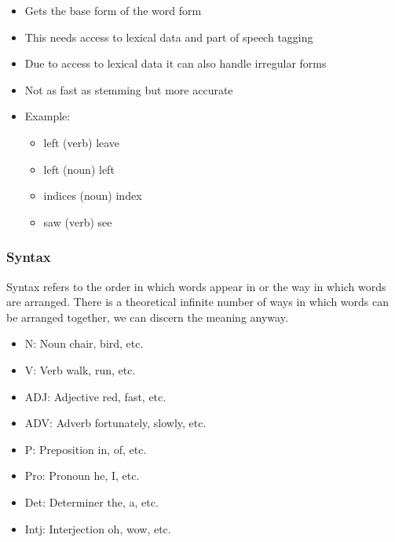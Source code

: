 \documentclass[
../../NLP4W_Summary.tex,
]
{subfiles}
\begin{document}
\begin{defbox}
\begin{itemize}
\begin{itemize}
            \item Gets the base form of the word form
            \item This needs access to lexical data and part of speech tagging
            \item Due to access to lexical data it can also handle irregular forms
            \item Not as fast as stemming but more accurate
            \item Example:
            \begin{itemize}
                \item left (verb) \rightarrow leave
                \item left (noun) \rightarrow left
                \item indices (noun) \rightarrow index
                \item saw (verb) \rightarrow see
            \end{itemize}
        \end{itemize}
    \end{itemize}
\end{defbox}

\subsubsection{Syntax}
Syntax refers to the order in which words appear in or the way in which words are arranged. There is a theoretical infinite number of ways in which words can be arranged together, we can discern the meaning anyway.

\begin{defbox}
    \begin{itemize}
        \item N: Noun \rightarrow chair, bird, etc.
        \item V: Verb \rightarrow walk, run, etc.
        \item ADJ: Adjective \rightarrow red, fast, etc.
        \item ADV: Adverb \rightarrow fortunately, slowly, etc.
        \item P: Preposition \rightarrow in, of, etc.
        \item Pro: Pronoun \rightarrow he, I, etc.
        \item Det: Determiner \rightarrow the, a, etc.
        \item Intj: Interjection \rightarrow oh, wow, etc.
    \end{itemize}
\end{defbox}
\end{document}
